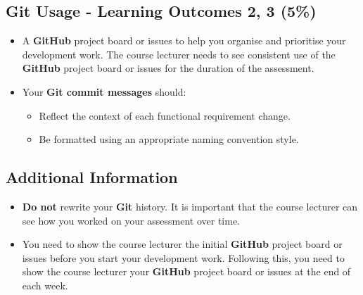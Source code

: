 \documentclass{article}
\begin{document}
\subsection*{Git Usage - Learning Outcomes 2, 3 (5\%)}
\begin{itemize}
  \item A \textbf{GitHub} project board or issues to help you organise and prioritise your development work. The course lecturer needs to see consistent use of the \textbf{GitHub} project board or issues for the duration of the assessment.
  \item Your \textbf{Git commit messages} should:
  \begin{itemize}
    \item Reflect the context of each functional requirement change.
    \item Be formatted using an appropriate naming convention style.
  \end{itemize}
\end{itemize}

\subsection*{Additional Information}
\begin{itemize}
    \item \textbf{Do not} rewrite your \textbf{Git} history. It is important that the course lecturer can see how you worked on your assessment over time. 
    \item You need to show the course lecturer the initial \textbf{GitHub} project board or issues before you start your development work. Following this, you need to show the course lecturer your \textbf{GitHub} project board or issues at the end of each week.
\end{itemize} 
\end{document}
